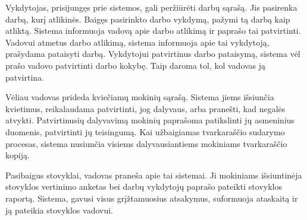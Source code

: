 Vykdytojas, prisijungęs prie sistemos, gali peržiūrėti darbų sąrašą. 
Jis pasirenka darbą, kurį atlikinės. Baigęs pasirinkto darbo vykdymą, 
pažymi tą darbą kaip atliktą. Sistema informuoja vadovą apie darbo 
atlikimą ir paprašo tai patvirtinti. Vadovui atmetus darbo atlikimą, 
sistema informuoja apie tai vykdytoją, prašydama pataisyti darbą. 
Vykdytojui patvirtinus darbo pataisymą, sistema vėl prašo vadovo 
patvirtinti darbo kokybę. Taip daroma tol, kol vadovas ją patvirtina. 

Vėliau vadovas prideda kviečiamų mokinių sąrašą. Sistema jiems 
išsiunčia kvietimus, reikalaudama patvirtinti, jog dalyvaus, 
arba pranešti, kad negalės atvykti. Patvirtinusių dalyvavimą 
mokinių paprašoma patikslinti jų asmeninius duomenis, patvirtinti 
jų teisingumą. Kai užbaigiamas tvarkaraščio sudarymo procesas, 
sistema nusiunčia visiems dalyvausiantiems mokiniams
tvarkaraščio kopiją.

Pasibaigus stovyklai, vadovas praneša apie tai sistemai. Ji mokiniams
išsiuntinėja stovyklos vertinimo anketas bei darbų vykdytojų paprašo 
pateikti stovyklos raportą. Sistema, gavusi visus grįžtamuosius atsakymus,
suformuoja ataskaitą ir ją pateikia stovyklos vadovui.

